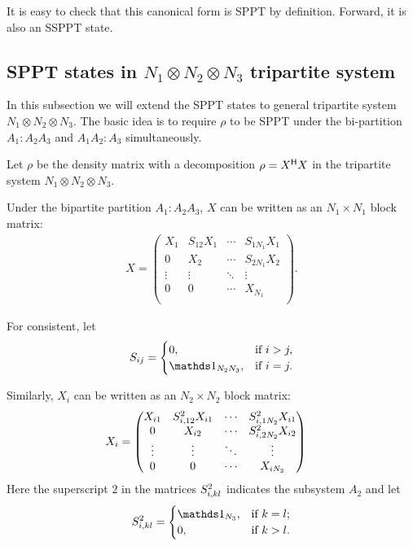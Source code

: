 It is easy to check that
this canonical form is SPPT by definition. Forward, it is also an  SSPPT state.

\subsection{SPPT states in \texorpdfstring{$N_1\otimes N_2\otimes N_3$}{TEXT} tripartite system}
In this subsection we will extend the SPPT states to  general tripartite system $N_1\otimes N_2\otimes N_3$. The basic
idea is to  require $\rho$ to be SPPT under the bi-partition $A_1:A_2A_3$ and $A_1A_2:A_3$ simultaneously.

Let $\rho$ be the density matrix with a   decomposition $ \rho= X^{\mathsf{H}} X$ in the tripartite system $N_1\otimes N_2\otimes
N_3$.

Under the bipartite partition $A_1:A_2A_3$, $X$ can be written as an $N_1\times N_1$ block matrix:
\begin{equation}
  \begin{split}
  X
  = 
  \begin{pmatrix}
    X_1 & S_{12}X_1&\cdots &S_{1N_1}X_1\\
    0 & X_2&\cdots  & S_{2N_1}X_2\\
    \vdots &\vdots &\ddots &\vdots\\
    0 & 0  &\cdots& X_{N_1}\\
  \end{pmatrix}.
  \end{split}
\end{equation}

For consistent, let
\begin{equation}
  \label{multiSPPTv0.6:eq:3}
  S_{ij} =
  \begin{cases}
    0, &  \text{if } i>j,\\
    \I_{N_2N_3},& \text{if } i=j.
  \end{cases}
\end{equation}

Similarly, $X_i$ can
be written as an $N_2\times N_2$ block matrix:
\begin{equation*}
  \begin{split}
    X_i &=
    \begin{pmatrix}
      X_{i1} & S^2_{i,12}X_{i1} & \cdots &S^2_{i,1N_2}X_{i1}\\
      0 & X_{i2} & \cdots & S^2_{i,2N_2}X_{i2}\\
      \vdots & \vdots & \ddots & \vdots \\
      0 & 0 & \cdots & X_{iN_2}
    \end{pmatrix}   
  \end{split}
\end{equation*}
Here the superscript $2$ in the matrices $S^2_{i,kl}$ indicates the subsystem $A_2$ and let
\begin{equation*}
  \sijklt{i}{kl} =
  \begin{cases}
    \I_{N_3},& \text{if }  k=l;\\
    0, & \text{if } k>l.
  \end{cases}
\end{equation*}

